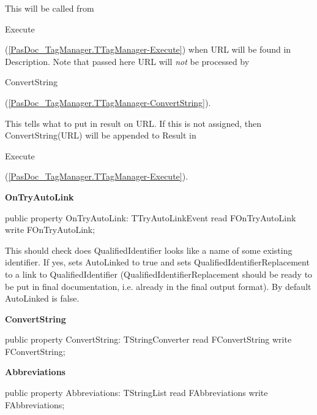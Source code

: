 \documentclass{report}
\newif\ifpdf
\begin{document}
\begin{list}{}
\begin{flushleft}
\ifpdf
\end{flushleft}
\fi


\par This will be called from \begin{ttfamily}Execute\end{ttfamily}(\ref{PasDoc_TagManager.TTagManager-Execute}) when URL will be found in Description. Note that passed here URL will \textit{not} be processed by \begin{ttfamily}ConvertString\end{ttfamily}(\ref{PasDoc_TagManager.TTagManager-ConvertString}).

This tells what to put in result on URL. If this is not assigned, then ConvertString(URL) will be appended to Result in \begin{ttfamily}Execute\end{ttfamily}(\ref{PasDoc_TagManager.TTagManager-Execute}).\label{PasDoc_TagManager.TTagManager-OnTryAutoLink}
\item[\textbf{OnTryAutoLink}\hfill]
\ifpdf
\begin{flushleft}
\fi
\begin{ttfamily}
public property OnTryAutoLink: TTryAutoLinkEvent
      read FOnTryAutoLink write FOnTryAutoLink;\end{ttfamily}

\ifpdf
\end{flushleft}
\fi


\par This should check does QualifiedIdentifier looks like a name of some existing identifier. If yes, sets AutoLinked to true and sets QualifiedIdentifierReplacement to a link to QualifiedIdentifier (QualifiedIdentifierReplacement should be ready to be put in final documentation, i.e. already in the final output format). By default AutoLinked is false.\label{PasDoc_TagManager.TTagManager-ConvertString}
\item[\textbf{ConvertString}\hfill]
\ifpdf
\begin{flushleft}
\fi
\begin{ttfamily}
public property ConvertString: TStringConverter
      read FConvertString write FConvertString;\end{ttfamily}

\ifpdf
\end{flushleft}
\fi


\par  \label{PasDoc_TagManager.TTagManager-Abbreviations}
\item[\textbf{Abbreviations}\hfill]
\ifpdf
\begin{flushleft}
\fi
\begin{ttfamily}
public property Abbreviations: TStringList read FAbbreviations write FAbbreviations;\end{ttfamily}


\end{flushleft}
\end{list}
\end{document}
